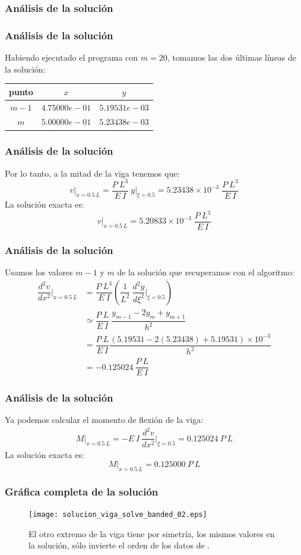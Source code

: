 \subsubsection{Análisis de la solución}
\begin{frame}
\frametitle{Análisis de la solución}
Habiendo ejecutado el programa con $m=20$, tomamos las dos últimas líneas de la solución:
\begin{center}
\begin{tabular}{| c | c| c |} \hline
punto & $x$ & $y$ \\ \hline
$m-1$ & $4.75000e-01$ & $5.19531e-03$ \\ \hline
$m$ & $5.00000e-01$ & $5.23438e-03$ \\ \hline
\end{tabular}
\end{center}
\end{frame}
\begin{frame}
\frametitle{Análisis de la solución}
Por lo tanto, a la mitad de la viga tenemos que:
\[ v \vert_{x=0.5 \: L} = \dfrac{P  \: L^{3}}{E \: I} \: y \bigg\vert_{\xi=0.5} = 5.23438 \times 10^{-3} \; \dfrac{P \: L^{3}}{E \: I} \]
\pause
La solución exacta es:
\[ v \vert_{x=0.5 \: L} = 5.20833 \times 10^{-3} \; \dfrac{P \: L^{3}}{E \: I} \]
\end{frame}
\begin{frame}
\frametitle{Análisis de la solución}
Usamos los valores $m-1$ y $m$ de la solución que recuperamos con el algoritmo:
\fontsize{12}{12}\selectfont
\begin{align*}
\dfrac{d^{2} v}{d x^{2}} \bigg\vert_{x=0.5 \: L} &= \dfrac{P \: L^{3}}{E \: I} \left( \dfrac{1}{L^{2}} \: \dfrac{d^{2} y}{d \xi^{2}} \bigg\vert_{\xi=0.5} \right) \\
&\simeq  \dfrac{P \: L}{E \: I} \: \dfrac{y_{m-1} - 2 y_{m} + y_{m+1}}{h^{2}} \\
&= \dfrac{P \: L}{E \: I} \dfrac{(5.19531 - 2(5.23438) + 5.19531) \times 10^{-3}}{h^{2}} \\
&= -0.125024 \: \dfrac{P \: L}{E \: I}
\end{align*}
\end{frame}
\begin{frame}
\frametitle{Análisis de la solución}
Ya podemos calcular el momento de flexión de la viga:
\begin{align*}
M \big\vert_{x=0.5 \: L} = - E \: I \: \dfrac{d^{2} v}{d x^{2}} \bigg\vert_{\xi=0.5} = 0.125024 \: P \: L
\end{align*}
\pause
La solución exacta es:
\[ M \big\vert_{x=0.5 \: L} = 0.125000 \: P \: L\]
\end{frame}
\begin{frame}[plain]
\frametitle{Gráfica completa de la solución}
\begin{figure}
    \centering
    \texttt{[image: solucion\_viga\_solve\_banded\_02.eps]}
    \caption{El otro extremo de la viga tiene por simetría, los mismos valores en la solución, sólo invierte el orden de los datos de .}
\end{figure}
\end{frame}
